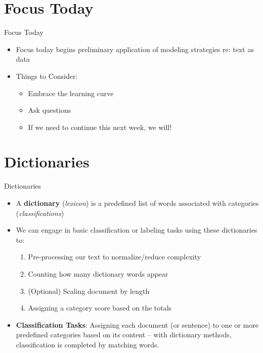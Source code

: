 \documentclass[
  ignorenonframetext,
  aspectratio=169]{beamer}
\begin{document}
\section{Focus Today}\label{focus-today}

\begin{frame}{Focus Today}
\label{focus-today-1}
\begin{itemize}
\item Focus today begins preliminary application of modeling strategies re: text as data \par \vspace{2.5mm}
\item Things to Consider: 
  \begin{itemize}
  \item Embrace the learning curve 
  \item Ask questions
  \item If we need to continue this next week, we will! 
  \end{itemize}
\end{itemize}
\end{frame}

\section{Dictionaries}\label{dictionaries}

\begin{frame}{Dictionaries}
\label{dictionaries-1}
\begin{itemize}
\item A \textbf{dictionary} (\textit{lexicon}) is a predefined list of words associated with categories (\textit{classifications}) \par \vspace{2.5mm}
\item We can engage in basic classification or labeling tasks using these dictionaries to: 
  \begin{enumerate}
  \item Pre-processing our text to normalize/reduce complexity
  \item Counting how many dictionary words appear
  \item (Optional) Scaling document by length
  \item Assigning a category score based on the totals
  \end{enumerate} \par \vspace{2.5mm}
  \item \textbf{Classification Tasks}: Assigning each document (or sentence) to one or more predefined categories based on its content -- with dictionary methods, classification is completed by matching words. 
\end{itemize}
\end{frame}
\end{document}
